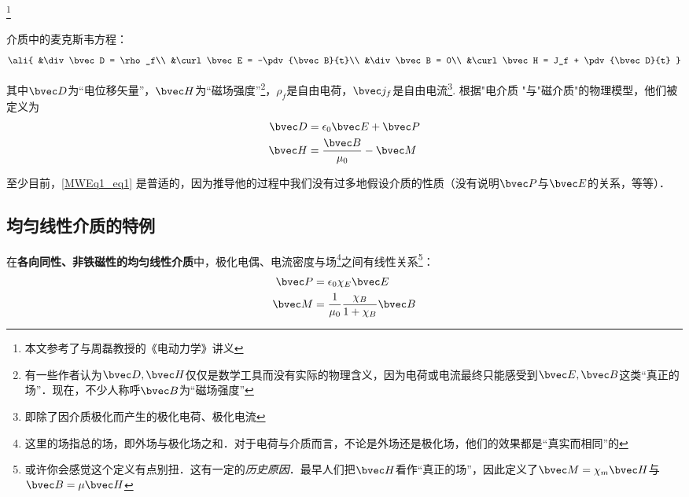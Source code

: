 
\footnote{本文参考了\cite{GriffE}与周磊教授的《电动力学》讲义}
\begin{issues}
\issueDraft
\end{issues}

介质中的麦克斯韦方程：
\begin{equation}\label{MWEq1_eq1}\ali{
&\div\bvec D = \rho_f\\
&\curl\bvec E = -\pdv{\bvec B}{t}\\
&\div\bvec B = 0\\
&\curl\bvec H = J_f + \pdv{\bvec D}{t}
}\end{equation}

其中$\bvec D$为“电位移矢量”，$\bvec H$为“磁场强度”\footnote{有一些作者认为$\bvec D, \bvec H$仅仅是数学工具而没有实际的物理含义，因为电荷或电流最终只能感受到$\bvec E, \bvec B$这类“真正的场”．现在，不少人称呼$\bvec B$为“磁场强度”}，$\rho_f$是自由电荷，$\bvec j_f$是自由电流\footnote{即除了因介质极化而产生的极化电荷、极化电流}. 根据"电介质  "与"磁介质"的物理模型，他们被定义为
\begin{align}
\bvec D &= \epsilon_0 \bvec E + \bvec P\\
\bvec H &= \frac{\bvec B}{\mu_0} - \bvec M\\
\end{align}

至少目前，\autoref{MWEq1_eq1} 是普适的，因为推导他的过程中我们没有过多地假设介质的性质（没有说明$\bvec P$与$\bvec E$的关系，等等）．

\subsection{均匀线性介质的特例}
在\textbf{各向同性、非铁磁性的均匀线性介质}中，极化电偶、电流密度与场\footnote{这里的场指总的场，即外场与极化场之和．对于电荷与介质而言，不论是外场还是极化场，他们的效果都是“真实而相同”的}之间有线性关系\footnote{或许你会感觉这个定义有点别扭．这有一定的\textsl{历史原因}．最早人们把$\bvec H$看作“真正的场”，因此定义了$\bvec M = \chi_m \bvec H$与$\bvec B = \mu \bvec H$}：
\begin{align}
\bvec P &= \epsilon_0 \chi_E \bvec E\\
\bvec M &= \frac{1}{\mu_0} \frac{\chi_B}{1+\chi_B}\bvec B\\
\end{align}

